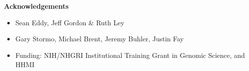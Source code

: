 \documentclass[landscape]{slides}
\begin{document}
\begin{slide}

\large
\begin{center}
\large{\textbf{Acknowledgements}}
\end{center}

\small

\begin{itemize}
\item
  Sean Eddy, Jeff Gordon \& Ruth Ley 
\item
  Gary Stormo, Michael Brent, Jeremy Buhler, Justin Fay 
\item
  Funding: NIH/NHGRI Institutional Training Grant in Genomic Science,
  and HHMI
\end{itemize}

\vspace{1in}

\vfill
\end{slide}

\end{document}
